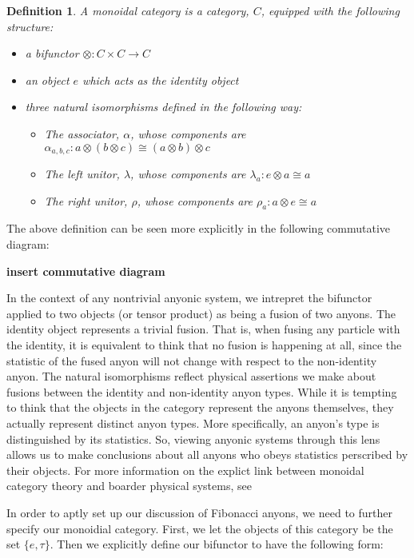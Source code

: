 \documentclass[10pt]{ucthesis}
\newtheorem{definition}{Definition}[chapter]
\begin{document}
\begin{definition}
	A monoidal category is a category, $C$, equipped with the following structure:
\begin{itemize}
	\item a bifunctor $\otimes:C\times C\rightarrow C$
	\item an object $e$ which acts as the identity object
	\item three natural isomorphisms defined in the following way:
		\begin{itemize}
			\item The associator, $\alpha$, whose components are $\alpha_{a,b,c}: a\otimes(b\otimes c) \cong (a\otimes b)\otimes c$
			\item The left unitor, $\lambda$, whose components are $\lambda_a : e\otimes a \cong a$
			\item The right unitor, $\rho$, whose components are $\rho_a:a\otimes e \cong a$
		\end{itemize}
\end{itemize}
\end{definition}

The above definition can be seen more explicitly in the following commutative diagram:


\textbf{insert commutative diagram}


In the context of any nontrivial anyonic system, we intrepret the bifunctor applied to two objects (or tensor product) as being a fusion of two anyons. The identity object represents a trivial fusion. That is, when fusing any particle with the identity, it is equivalent to think that no fusion is happening at all, since the statistic of the fused anyon will not change with respect to the non-identity anyon. The natural isomorphisms reflect physical assertions we make about fusions between the identity and non-identity anyon types. While it is tempting to think that the objects in the category represent the anyons themselves, they actually represent distinct anyon types. More specifically, an anyon's type is distinguished by its statistics. So, viewing anyonic systems through this lens allows us to make conclusions about all anyons who obeys statistics perscribed by their objects. For more information on the explict link between monoidal category theory and boarder physical systems, see \cite{Rose3}

In order to aptly set up our discussion of Fibonacci anyons, we need to further specify our monoidial category. First, we let the objects of this category be the set $\{e,\tau\}$. Then we explicitly define our bifunctor to have the following form:
\end{document}

